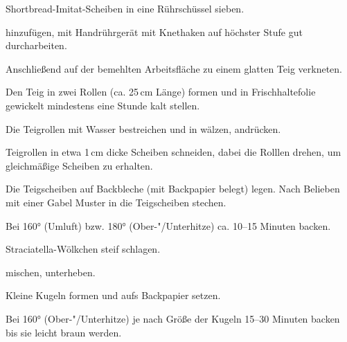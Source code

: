 \begin{recipe}{Shortbread-Imitat-Scheiben}
  in eine Rührschüssel sieben.
  
  hinzufügen, mit Handrührgerät mit Knethaken auf höchster Stufe gut
  durcharbeiten.

  Anschließend auf der bemehlten Arbeitsfläche zu einem glatten Teig
  verkneten.
  
  Den Teig in zwei Rollen (ca. 25\,cm Länge) formen und in
  Frischhaltefolie gewickelt mindestens eine Stunde kalt stellen.

  Die Teigrollen mit Wasser bestreichen und in
  wälzen, andrücken.
  
  Teigrollen in etwa 1\,cm dicke Scheiben schneiden, dabei die Rolllen
  drehen, um gleichmäßige Scheiben zu erhalten.

  Die Teigscheiben auf Backbleche (mit Backpapier belegt) legen. Nach
  Belieben mit einer Gabel Muster in die Teigscheiben stechen.

  Bei 160° (Umluft) bzw. 180° (Ober-"/Unterhitze) ca. 10--15 Minuten backen.
\end{recipe}



\begin{recipe}{Straciatella-Wölkchen}
  steif schlagen.

  mischen, unterheben.

  
  Kleine Kugeln formen und aufs Backpapier setzen.

  Bei 160° (Ober-"/Unterhitze) je nach Größe der Kugeln 15--30 Minuten
  backen bis sie leicht braun werden.
\end{recipe}




